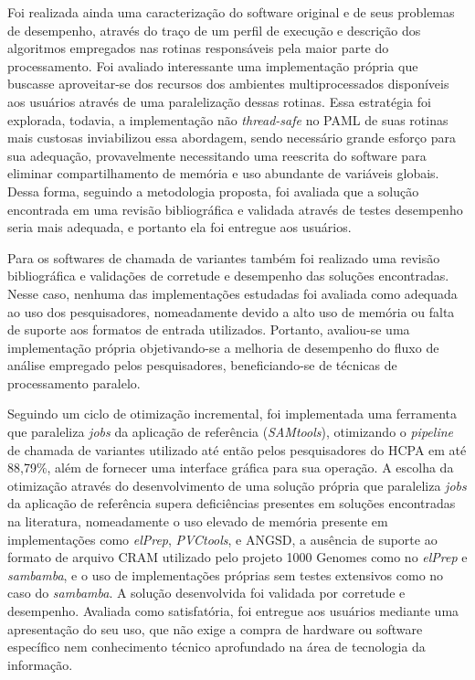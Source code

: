 \documentclass[cic,tc]{iiufrgs}
\begin{document}
Foi realizada ainda uma caracterização do software original e de seus problemas
de desempenho, através do traço de um perfil de execução e descrição dos
algoritmos empregados nas rotinas responsáveis pela maior parte do
processamento. Foi avaliado interessante uma implementação própria que buscasse
aproveitar-se dos recursos dos ambientes multiprocessados disponíveis aos
usuários através de uma paralelização dessas rotinas. Essa estratégia foi
explorada, todavia, a implementação não \textit{thread-safe} no PAML de suas
rotinas mais custosas inviabilizou essa abordagem, sendo necessário grande
esforço para sua adequação, provavelmente necessitando uma reescrita do
software para eliminar compartilhamento de memória e uso abundante de variáveis
globais. Dessa forma, seguindo a metodologia proposta, foi avaliada que a
solução encontrada em uma revisão bibliográfica e validada através de testes
desempenho seria mais adequada, e portanto ela foi entregue aos usuários.

Para os softwares de chamada de variantes também foi realizado uma revisão
bibliográfica e validações de corretude e desempenho das soluções encontradas.
Nesse caso, nenhuma das implementações estudadas foi avaliada como adequada ao
uso dos pesquisadores, nomeadamente devido a alto uso de memória ou falta de
suporte aos formatos de entrada utilizados. Portanto, avaliou-se uma
implementação própria objetivando-se a melhoria de desempenho do fluxo de
análise empregado pelos pesquisadores, beneficiando-se de técnicas de
processamento paralelo.

Seguindo um ciclo de otimização incremental, foi implementada uma ferramenta
que paraleliza \textit{jobs} da aplicação de referência (\textit{SAMtools}),
otimizando o \textit{pipeline} de chamada de variantes utilizado até então
pelos pesquisadores do HCPA em até 88,79\%, além de fornecer uma interface
gráfica para sua operação. A escolha da otimização através do desenvolvimento
de uma solução própria que paraleliza \textit{jobs} da aplicação de referência
supera deficiências presentes em soluções encontradas na literatura,
nomeadamente o uso elevado de memória presente em implementações como
\textit{elPrep}, \textit{PVCtools}, e ANGSD, a ausência de suporte ao formato de arquivo
CRAM utilizado pelo projeto 1000 Genomes como no \textit{elPrep} e
\textit{sambamba}, e o uso de implementações próprias sem testes extensivos
como no caso do \textit{sambamba}. A solução desenvolvida foi validada por
corretude e desempenho. Avaliada como satisfatória, foi entregue aos usuários
mediante uma apresentação do seu uso, que não exige a compra de hardware ou
software específico nem conhecimento técnico aprofundado na área de tecnologia
da informação.
\end{document}
